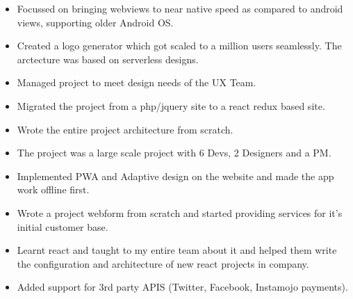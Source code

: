 \documentclass[10pt,a4paper,ragged2e,withhyper]{altacv}
\begin{document}
\begin{paracol}{2}


\begin{itemize}
\item Focussed on bringing webviews to near native speed as compared to android views, supporting older Android OS.
\item Created a logo generator which got scaled to a million users seamlessly. The arctecture was based on serverless designs.
\end{itemize}

\divider

\begin{itemize}
\item Managed project to meet design needs of the UX Team.
\item Migrated the project from a php/jquery site to a react redux based site.
\item Wrote the entire project architecture from scratch.
\item The project was a large scale project with 6 Devs, 2 Designers and a PM.
\item Implemented PWA and Adaptive design on the website and made the app work offline first.
\end{itemize}

\divider


\begin{itemize}
\item Wrote a project webform from scratch and started providing services for it's initial customer base.
\item Learnt react and taught to my entire team about it and helped them write the configuration and architecture of new react projects in company.
\item Added support for 3rd party APIS (Twitter, Facebook, Instamojo payments).
\end{itemize}

\divider



\end{paracol}
\end{document}
